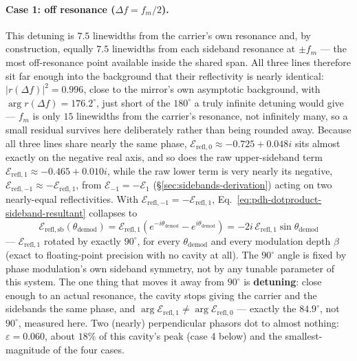 \documentclass[9pt]{article}
\begin{document}
\paragraph{Case 1: off resonance ($\Delta f=f_m/2$).} This detuning is
$7.5$ linewidths from the carrier's own resonance and, by construction,
equally $7.5$ linewidths from each sideband resonance at $\pm f_m$ --- the
most off-resonance point available inside the shared span. All three lines
therefore sit far enough into the background that their reflectivity is
nearly identical: $|r(\Delta f)|^2=0.996$, close to the mirror's own
asymptotic background, with $\arg r(\Delta f)=176.2^\circ$, just short of
the $180^\circ$ a truly infinite detuning would give --- $f_m$ is only $15$
linewidths from the carrier's resonance, not infinitely many, so a small
residual survives here deliberately rather than being rounded away.
Because all three lines share nearly the same phase,
$\mathcal{E}_{\mathrm{refl},0}\approx-0.725+0.048i$ sits almost exactly on
the negative real axis, and so does the raw upper-sideband term
$\mathcal{E}_{\mathrm{refl},1}\approx-0.465+0.010i$, while the raw lower
term is very nearly its negative,
$\mathcal{E}_{\mathrm{refl},-1}\approx-\mathcal{E}_{\mathrm{refl},1}$, from
$\mathcal{E}_{-1}=-\mathcal{E}_1$ (\S\ref{sec:sidebands-derivation}) acting
on two nearly-equal reflectivities. With
$\mathcal{E}_{\mathrm{refl},-1}=-\mathcal{E}_{\mathrm{refl},1}$,
Eq.~\eqref{eq:pdh-dotproduct-sideband-resultant} collapses to
\[
\mathcal{E}_{\mathrm{refl,sb}}(\theta_{\mathrm{demod}}) = \mathcal{E}_{\mathrm{refl},1}\left(e^{-i\theta_{\mathrm{demod}}}-e^{i\theta_{\mathrm{demod}}}\right) = -2i\,\mathcal{E}_{\mathrm{refl},1}\sin\theta_{\mathrm{demod}}
\]
--- $\mathcal{E}_{\mathrm{refl},1}$ rotated by exactly $90^\circ$, for every
$\theta_{\mathrm{demod}}$ and every modulation depth $\beta$ (exact to
floating-point precision with no cavity at all). The $90^\circ$ angle is
fixed by phase modulation's own sideband symmetry, not by any tunable
parameter of this system. The one thing that moves it away from $90^\circ$
is \textbf{detuning}: close enough to an actual resonance, the cavity stops
giving the carrier and the sidebands the same phase, and
$\arg\mathcal{E}_{\mathrm{refl},1}\ne\arg\mathcal{E}_{\mathrm{refl},0}$ ---
exactly the $84.9^\circ$, not $90^\circ$, measured here.
Two (nearly) perpendicular phasors dot to almost nothing: $\varepsilon=0.060$,
about $18\%$ of this cavity's peak (case 4 below) and the
smallest-magnitude of the four cases.
\end{document}
